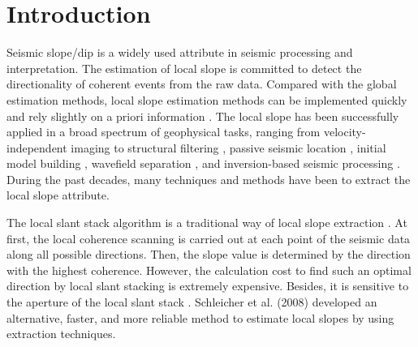 

\section{Introduction}
Seismic slope/dip is a widely used attribute in seismic processing and interpretation. 
The estimation of local slope is committed to detect the directionality of coherent events from the raw data. Compared with the global estimation methods, local slope estimation methods can be implemented quickly and rely slightly on a priori information \cite{Schleicher2008}.
The local slope has been successfully applied in a broad spectrum of geophysical tasks, ranging from velocity-independent imaging \cite{Kevin2004, Sergey2007, Matthew2020} to 
structural filtering \cite{liuyang2010, 2020Deblending, qushan2019geo, wanghang2020tgrs2}, passive seismic location \cite{Mohammad2015, Khoshnavaz2017}, initial model building \cite{guangtan2020tgrs1}, wavefield separation \cite{pwd}, and inversion-based seismic processing \cite{Sergey2007, Zhiguang2016}. 
During the past decades, many techniques and methods have been  to extract the local slope attribute.

The local slant stack algorithm is a traditional way of local slope extraction \cite{Ottolini1983}.  At first, the local coherence scanning is carried out at each point of the seismic data along all possible directions. Then, the slope value is determined by the direction with the highest coherence.  However, the calculation cost to find such an optimal direction by local slant stacking is extremely expensive. Besides, it is sensitive to the aperture of the local slant stack \cite{Schleicher2008, Santos2009}. Schleicher et al. (2008) \cite{Schleicher2008} developed an alternative, faster, and more reliable method to estimate local slopes by using  extraction techniques. 

